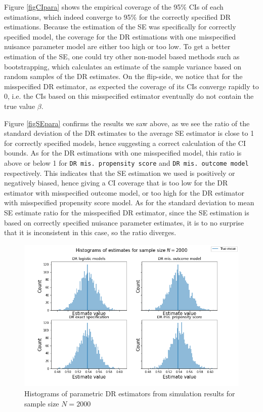 \documentclass[12pt,twoside]{article}
\begin{document}
Figure \ref{figCIpara} shows the empirical coverage of the 95\% CIs of each estimations, which indeed converge to 95\% for the correctly specified DR estimations. Because the estimation of the SE was specifically for correctly specified model, the coverage for the DR estimations with one misspecified nuisance parameter model are either too high or too low. To get a better estimation of the SE, one could try other non-model based methods such as bootstrapping, which calculates an estimate of the sample variance based on random samples of the DR estimates. On the flip-side, we notice that for the misspecified DR estimator, as expected the coverage of its CIs converge rapidly to 0, i.e. the CIs based on this misspecified estimator eventually do not contain the true value $\beta$.

Figure \ref{figSEpara} confirms the results we saw above, as we see the ratio of the standard deviation of the DR estimates to the average SE estimator is close to 1 for correctly specified models, hence suggesting a correct calculation of the CI bounds. As for the DR estimations with one misspecified model, this ratio is above or below 1 for \texttt{DR mis. propensity score} and \texttt{DR mis. outcome model} respectively. This indicates that the SE estimation we used is positively or negatively biased, hence giving a CI coverage that is too low for the DR estimator with misspecified outcome model, or too high for the DR estimator with misspecified propensity score model. As for the standard deviation to mean SE estimate ratio for the misspecified DR estimator, since the SE estimation is based on correctly specified nuisance parameter estimates, it is to no surprise that it is inconsistent in this case, so the ratio diverges.

\begin{figure}[h!]
    \centering
    \includegraphics[width = 0.9\columnwidth]{figures/histpara.png}
    \caption{Histograms of parametric DR estimators from simulation results for sample size $N = 2000$}
    \label{fighistpara}
\end{figure}
\end{document}
